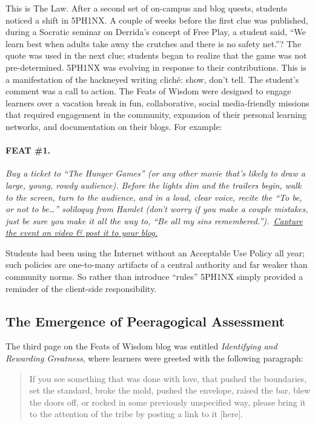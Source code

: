 This is The Law. After a second set of on-campus and blog quests,
students noticed a shift in 5PH1NX. A couple of weeks before the first
clue was published, during a Socratic seminar on Derrida's concept of
Free Play, a student said, ``We learn best when adults take away the
crutches and there is no safety net.''? The quote was used in the next
clue; students began to realize that the game was not pre-determined.
5PH1NX was evolving in response to their contributions. This is a
manifestation of the hackneyed writing cliché: show, don't tell. The
student's comment was a call to action. The Feats of Wisdom were
designed to engage learners over a vacation break in fun, collaborative,
social media-friendly missions that required engagement in the
community, expansion of their personal learning networks, and
documentation on their blogs. For example:

\paragraph{FEAT \#1.}\label{feat-1.}

\emph{Buy a ticket to ``The Hunger Games'' (or any other movie that's
likely to draw a large, young, rowdy audience). Before the lights dim
and the trailers begin, walk to the screen, turn to the audience, and in
a loud, clear voice, recite the ``To be, or not to be\ldots{}''
soliloquy from Hamlet (don't worry if you make a couple mistakes, just
be sure you make it all the way to, ``Be all my sins
remembered.'').~\href{http://alarhsenglitcomp.blogspot.com/2012/12/feats-of-wisdom-1_15.html}{Capture
the event on video \& post it to your blog.}}

Students had been using the Internet without an Acceptable Use Policy
all year; such policies are one-to-many artifacts of a central authority
and far weaker than community norms. So rather than introduce ``rules''
5PH1NX simply provided a reminder of the client-side responsibility.

\subsection{The Emergence of Peeragogical
Assessment}\label{the-emergence-of-peeragogical-assessment}

The third page on the Feats of Wisdom blog was entitled
\emph{Identifying and Rewarding Greatness}, where learners were greeted
with the following paragraph:

\begin{quote}
If you see something that was done with love, that pushed the
boundaries, set the standard, broke the mold, pushed the envelope,
raised the bar, blew the doors off, or rocked in some previously
unspecified way, please bring it to the attention of the tribe by
posting a link to it {{[}here{]}}.
\end{quote}

